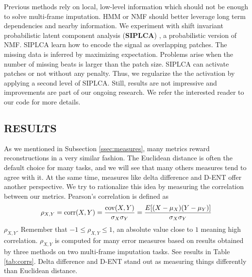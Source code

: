 \documentclass{article}
\begin{document}
Previous methods rely on local, low-level information which should not
be enough to solve multi-frame imputation. HMM or NMF should better
leverage long term dependencies and nearby information.  We experiment
with shift invariant probabilistic latent component analysis
(\textbf{SIPLCA}) \cite{Smaragdis2009,Weiss2010}, a probabilistic
version of NMF. SIPLCA learn how to encode the signal as overlapping
patches. The missing data is inferred by maximizing expectation.
Problems arise when the number of missing beats is larger than the
patch size. SIPLCA can activate patches or not without any
penalty. Thus, we regularize the the activation by applying a second
level of SIPLCA.  Still, results are not impressive and improvements
are part of our ongoing research. We refer the interested reader to
our code for more details.



\subsection{RESULTS}
\label{ssec:results}
As we mentioned in Subsection \ref{ssec:measures}, many metrics reward
reconstructions in a very similar fashion. The Euclidean distance is
often the default choice for many tasks, and we will see that many
others measures tend to agree with it. At the same time, measures like
delta difference and D-ENT offer another perspective. We try to
rationalize this idea by measuring the correlation between our
metrics. Pearson's correlation is defined as
\[  \rho_{X,Y}=\mathrm{corr}(X,Y)={\mathrm{cov}(X,Y) \over \sigma_X
    \sigma_Y} ={E[(X-\mu_X)(Y-\mu_Y)] \over \sigma_X\sigma_Y}
\]
$\rho_{X,Y}$. Remember that $-1 \leq \rho_{X,Y} \leq 1$, an absolute
value close to $1$ meaning high correlation. $\rho_{X,Y}$ is computed
for many error measures based on results obtained by three methods on
two multi-frame imputation tasks. See results in Table
\ref{tab:corrs}. Delta difference and D-ENT stand out as measuring
things differently than Euclidean distance.
\end{document}
